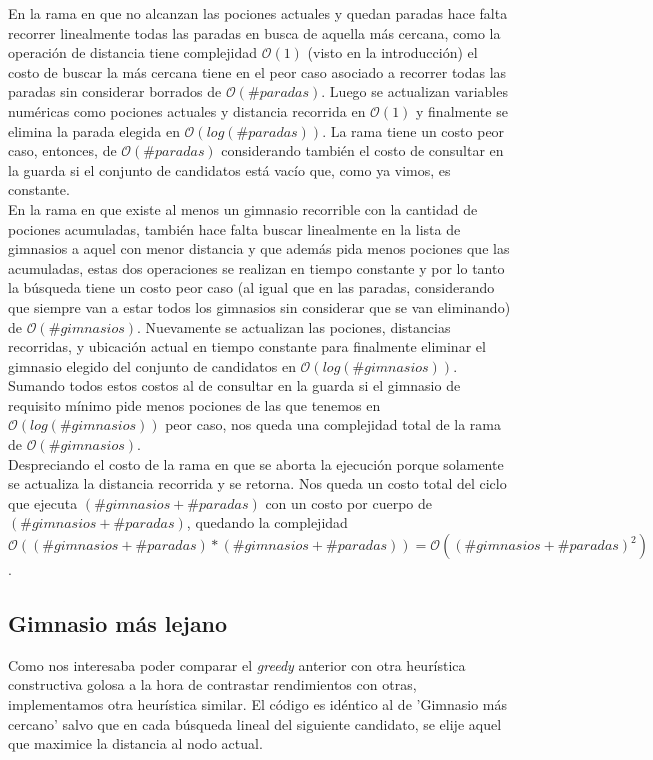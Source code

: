     En la rama en que no alcanzan las pociones actuales y quedan paradas hace falta recorrer linealmente todas las paradas en busca de aquella más cercana, como la operación de distancia tiene complejidad $\mathcal{O}(1)$ (visto en la introducción) el costo de buscar la más cercana tiene en el peor caso asociado a recorrer todas las paradas sin considerar borrados de $\mathcal{O}(\#paradas)$. Luego se actualizan variables numéricas como pociones actuales y distancia recorrida en $\mathcal{O}(1)$ y finalmente se elimina la parada elegida en $\mathcal{O}(log(\#paradas))$. La rama tiene un costo peor caso, entonces, de $\mathcal{O}(\#paradas)$ considerando también el costo de consultar en la guarda si el conjunto de candidatos está vacío que, como ya vimos, es constante.
    \\

    En la rama en que existe al menos un gimnasio recorrible con la cantidad de pociones acumuladas, también hace falta buscar linealmente en la lista de gimnasios a aquel con menor distancia y que además pida menos pociones que las acumuladas, estas dos operaciones se realizan en tiempo constante y por lo tanto la búsqueda tiene un costo peor caso (al igual que en las paradas, considerando que siempre van a estar todos los gimnasios sin considerar que se van eliminando) de $\mathcal{O}(\#gimnasios)$. Nuevamente se actualizan las pociones, distancias recorridas, y ubicación actual en tiempo constante para finalmente eliminar el gimnasio elegido del conjunto de candidatos en $\mathcal{O}(log(\#gimnasios))$. Sumando todos estos costos al de consultar en la guarda si el gimnasio de requisito mínimo pide menos pociones de las que tenemos en $\mathcal{O}(log(\#gimnasios))$ peor caso, nos queda una complejidad total de la rama de $\mathcal{O}(\#gimnasios)$.
    \\

    Despreciando el costo de la rama en que se aborta la ejecución porque solamente se actualiza la distancia recorrida y se retorna. Nos queda un costo total del ciclo que ejecuta $(\#gimnasios+\#paradas)$ con un costo por cuerpo de $(\#gimnasios+\#paradas)$, quedando la complejidad $\mathcal{O}((\#gimnasios+\#paradas) * (\#gimnasios+\#paradas)) = \mathcal{O}((\#gimnasios+\#paradas)^2)$.

    \subsection{Gimnasio más lejano}
    Como nos interesaba poder comparar el \emph{greedy} anterior con otra heurística constructiva golosa a la hora de contrastar rendimientos con otras, implementamos otra heurística similar. El código es idéntico al de 'Gimnasio más cercano' salvo que en cada búsqueda lineal del siguiente candidato, se elije aquel que maximice la distancia al nodo actual.
    \\

